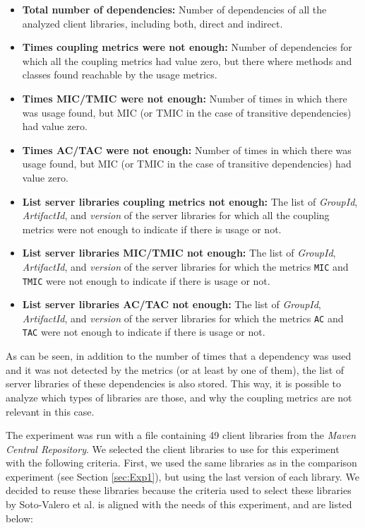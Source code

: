 \begin{itemize}
  \item \textbf{Total number of dependencies:} Number of dependencies of all the analyzed client libraries, including both, direct and indirect.
  \item \textbf{Times coupling metrics were not enough:} Number of dependencies for which all the coupling metrics had value zero, but there where methods and classes found reachable by the usage metrics.
  \item \textbf{Times MIC/TMIC were not enough:} Number of times in which there was usage found, but MIC (or TMIC in the case of transitive dependencies) had value zero.
  \item \textbf{Times AC/TAC were not enough:} Number of times in which there was usage found, but MIC (or TMIC in the case of transitive dependencies) had value zero.
  \item \textbf{List server libraries coupling metrics not enough:} The list of \textit{GroupId}, \textit{ArtifactId}, and \textit{version} of the server libraries for which all the coupling metrics were not enough to indicate if there is usage or not.
  \item \textbf{List server libraries MIC/TMIC not enough:} The list of \textit{GroupId}, \textit{ArtifactId}, and \textit{version} of the server libraries for which the metrics \texttt{MIC} and \texttt{TMIC} were not enough to indicate if there is usage or not.
  \item \textbf{List server libraries AC/TAC not enough:} The list of \textit{GroupId}, \textit{ArtifactId}, and \textit{version} of the server libraries for which the metrics \texttt{AC} and \texttt{TAC} were not enough to indicate if there is usage or not.
\end{itemize}

As can be seen, in addition to the number of times that a dependency was used and it was not detected by the metrics (or at least by one of them), the list of server libraries of these dependencies is also stored. This way, it is possible to analyze which types of libraries are those, and why the coupling metrics are not relevant in this case.

\blankl
The experiment was run with a file containing 49 client libraries from the \textit{Maven Central Repository}.  We selected the client libraries to use for this experiment with the following criteria. First, we used the same libraries as in the comparison experiment (see Section \ref{sec:Exp1}), but using the last version of each library. We decided to reuse these libraries because the criteria used to select these libraries by Soto-Valero et al. \cite{soto2020comprehensive} is aligned with the needs of this experiment, and are listed below:

